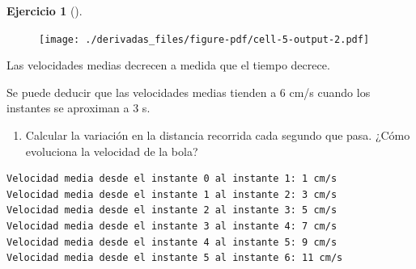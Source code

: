 \documentclass[
  a4paper,
]{scrreport}
\newenvironment{Shaded}{\begin{snugshade}}{\end{snugshade}}
\newcommand{\ControlFlowTok}[1]{\textcolor[rgb]{0.00,0.23,0.31}{#1}}
\newcommand{\FloatTok}[1]{\textcolor[rgb]{0.68,0.00,0.00}{#1}}
\newcommand{\FunctionTok}[1]{\textcolor[rgb]{0.28,0.35,0.67}{#1}}
\newcommand{\KeywordTok}[1]{\textcolor[rgb]{0.00,0.23,0.31}{#1}}
\newcommand{\NormalTok}[1]{\textcolor[rgb]{0.00,0.23,0.31}{#1}}
\newcommand{\OperatorTok}[1]{\textcolor[rgb]{0.37,0.37,0.37}{#1}}
\newcommand{\SpecialCharTok}[1]{\textcolor[rgb]{0.37,0.37,0.37}{#1}}
\newcommand{\StringTok}[1]{\textcolor[rgb]{0.13,0.47,0.30}{#1}}
\providecommand{\tightlist}{%
  \setlength{\itemsep}{0pt}\setlength{\parskip}{0pt}}\usepackage{longtable,booktabs,array}
\theoremstyle{definition}
\newtheorem{exercise}{Ejercicio}[chapter]
\theoremstyle{remark}
\begin{document}
\begin{exercise}[]
\begin{tcolorbox}
\begin{figure}[H]

{\centering \texttt{[image: ./derivadas\_files/figure-pdf/cell-5-output-2.pdf]}

}

\end{figure}

Las velocidades medias decrecen a medida que el tiempo decrece.

Se puede deducir que las velocidades medias tienden a \(6\) cm/s cuando
los instantes se aproximan a \(3\) s.

\end{tcolorbox}

\begin{enumerate}
\def\labelenumi{\alph{enumi}.}
\setcounter{enumi}{3}
\tightlist
\item
  Calcular la variación en la distancia recorrida cada segundo que pasa.
  ¿Cómo evoluciona la velocidad de la bola?
\end{enumerate}

\begin{tcolorbox}[enhanced jigsaw, titlerule=0mm, colframe=quarto-callout-tip-color-frame, opacityback=0, colback=white, toprule=.15mm, breakable, arc=.35mm, title=\textcolor{quarto-callout-tip-color}{\faLightbulb}\hspace{0.5em}{Solución}, bottomtitle=1mm, toptitle=1mm, rightrule=.15mm, bottomrule=.15mm, opacitybacktitle=0.6, coltitle=black, leftrule=.75mm, left=2mm, colbacktitle=quarto-callout-tip-color!10!white]

\begin{Shaded}
\end{Shaded}

\begin{verbatim}
Velocidad media desde el instante 0 al instante 1: 1 cm/s
Velocidad media desde el instante 1 al instante 2: 3 cm/s
Velocidad media desde el instante 2 al instante 3: 5 cm/s
Velocidad media desde el instante 3 al instante 4: 7 cm/s
Velocidad media desde el instante 4 al instante 5: 9 cm/s
Velocidad media desde el instante 5 al instante 6: 11 cm/s
\end{verbatim}


\end{tcolorbox}
\end{exercise}
\end{document}
